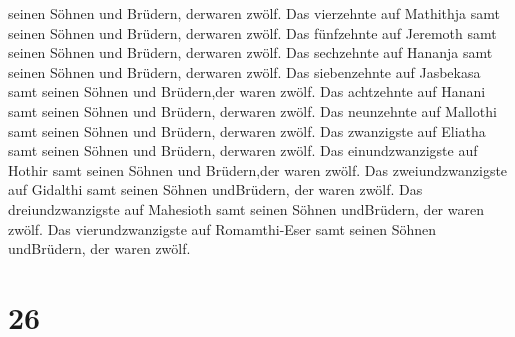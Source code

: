 seinen Söhnen und Brüdern, derwaren zwölf.  Das vierzehnte
auf Mathithja samt seinen Söhnen und Brüdern, derwaren zwölf.
 Das fünfzehnte auf Jeremoth samt seinen Söhnen und
Brüdern, derwaren zwölf.  Das sechzehnte auf Hananja samt
seinen Söhnen und Brüdern, derwaren zwölf.  Das
siebenzehnte auf Jasbekasa samt seinen Söhnen und Brüdern,der waren
zwölf.  Das achtzehnte auf Hanani samt seinen Söhnen und
Brüdern, derwaren zwölf.  Das neunzehnte auf Mallothi samt
seinen Söhnen und Brüdern, derwaren zwölf.  Das zwanzigste
auf Eliatha samt seinen Söhnen und Brüdern, derwaren zwölf.
 Das einundzwanzigste auf Hothir samt seinen Söhnen und
Brüdern,der waren zwölf.  Das zweiundzwanzigste auf
Gidalthi samt seinen Söhnen undBrüdern, der waren zwölf. 
Das dreiundzwanzigste auf Mahesioth samt seinen Söhnen undBrüdern, der
waren zwölf.  Das vierundzwanzigste auf Romamthi-Eser samt
seinen Söhnen undBrüdern, der waren zwölf.

\hypertarget{section-25}{%
\section{26}\label{section-25}}

